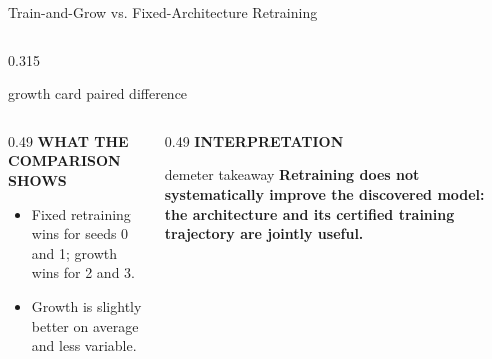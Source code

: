 \begin{frame}[t]{Train-and-Grow vs. Fixed-Architecture Retraining}
\begin{columns}[T,onlytextwidth]
\begin{column}{0.315\textwidth}
\begin{beamercolorbox}[rounded=true,sep=0.12cm,wd=\linewidth]{growth card}
        {\fontsize{6.5}{7.8}\selectfont paired difference}
      \end{beamercolorbox}
    \end{column}
  \end{columns}

  \vspace{0.15cm}
  \begin{columns}[T,onlytextwidth]
    \begin{column}{0.49\textwidth}
      {\color{EnstaBlue}\bfseries\scriptsize WHAT THE COMPARISON SHOWS}
      \vspace{0.03cm}

      {\fontsize{7.15}{8.6}\selectfont
      \begin{itemize}
        \setlength{\itemsep}{0.07cm}
        \item Fixed retraining wins for seeds 0 and 1; growth wins for 2 and 3.
        \item Growth is slightly better on average and less variable.
      \end{itemize}}
    \end{column}
    \begin{column}{0.49\textwidth}
      {\color{EnstaBlue}\bfseries\scriptsize INTERPRETATION}
      \vspace{0.03cm}

      \begin{beamercolorbox}[rounded=true,sep=0.10cm,wd=\linewidth]{demeter takeaway}
        {\fontsize{7.0}{8.4}\selectfont\bfseries
        Retraining does not systematically improve the discovered model: the
        architecture and its certified training trajectory are jointly useful.}
      \end{beamercolorbox}
    \end{column}
  \end{columns}
\end{frame}
